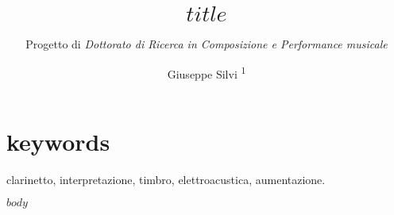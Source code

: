 \documentclass{gs-adonis}
\title{$title$}
\subtitle{Progetto di \emph{Dottorato di Ricerca in Composizione e Performance musicale}}
\author{Giuseppe Silvi \textsuperscript{1}}
\begin{document}
\maketitle
\section*{keywords}
clarinetto, interpretazione, timbro, elettroacustica, aumentazione.

$body$

\end{document}
